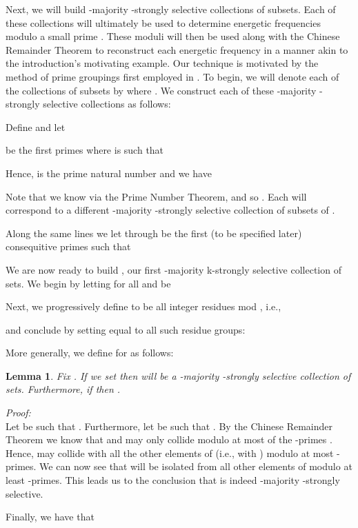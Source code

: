 \documentclass{article}
\begin{document}
Next, we will build  -majority -strongly selective collections of subsets.  Each of these  collections will ultimately be used to determine energetic frequencies modulo a small prime .  These moduli will then be used along with the Chinese Remainder Theorem to reconstruct each energetic frequency in a manner akin to the introduction's motivating example.  Our technique is motivated by the method of prime groupings first employed in \cite{FirstDetCS}.  To begin, we will denote each of the  collections of subsets by  where .  We construct each of these -majority -strongly selective collections as follows:  

Define  and let 
 
be the first  primes where  is such that

Hence,  is the  prime natural number and we have

Note that we know  via the Prime Number Theorem, and so .  Each  will correspond to a different -majority -strongly selective collection of subsets of .

Along the same lines we let  through  be the first  (to be specified later) consequitive primes such that
  
We are now ready to build , our first -majority k-strongly selective collection of sets.  We begin by letting  for all  and  be

Next, we progressively define  to be all integer residues mod , i.e., 

and conclude by setting  equal to all  such  residue groups:

More generally, we define  for  as follows:


\newtheorem{Lemma}{Lemma}
\begin{Lemma}
Fix .  If we set  then  will be a -majority -strongly selective collection of sets.  Furthermore, if  then .
\label{lem:S0strong}
\end{Lemma}

\noindent \textit{Proof:}\\

Let  be such that .  Furthermore, let  be such that .  By the Chinese Remainder Theorem we know that  and  may only collide modulo at most  of the  -primes .  Hence,  may collide with all the other elements of  (i.e., with ) modulo at most  -primes.  We can now see that  will be isolated from all other elements of  modulo at least  -primes.  This leads us to the conclusion that  is indeed -majority -strongly selective.

Finally, we have that
\end{document}
